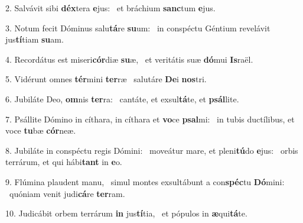 2. Salvávit sibi \textbf{déx}tera \textbf{e}jus: \ast\  et bráchium \textbf{sanc}tum \textbf{e}jus.\

3. Notum fecit Dóminus salu\textbf{tá}re \textbf{su}um: \ast\  in conspéctu Géntium revelávit jus\textbf{tí}tiam \textbf{su}am.\

4. Recordátus est miseri\textbf{cór}diæ \textbf{su}æ, \ast\  et veritátis suæ \textbf{dó}mui \textbf{Is}raël.\

5. Vidérunt omnes \textbf{tér}mini \textbf{ter}ræ \ast\  salutáre \textbf{De}i \textbf{nos}tri.\

6. Jubiláte Deo, \textbf{om}nis \textbf{ter}ra: \ast\  cantáte, et exsul\textbf{tá}te, et \textbf{psál}lite.\

7. Psállite Dómino in cíthara, in cíthara et \textbf{vo}ce \textbf{psal}mi: \ast\  in tubis ductílibus, et voce \textbf{tu}bæ \textbf{cór}neæ.\

8. Jubiláte in conspéctu regis Dómini: \dag\  moveátur mare, et pleni\textbf{tú}do \textbf{e}jus: \ast\  orbis terrárum, et qui hábi\textbf{tant} in \textbf{e}o.\

9. Flúmina plaudent manu, \dag\  simul montes exsultábunt a con\textbf{spéc}tu \textbf{Dó}mini: \ast\  quóniam venit judi\textbf{cá}re \textbf{ter}ram.\

10. Judicábit orbem terrárum \textbf{in} jus\textbf{tí}tia, \ast\  et pópulos in \textbf{æ}qui\textbf{tá}te.\

